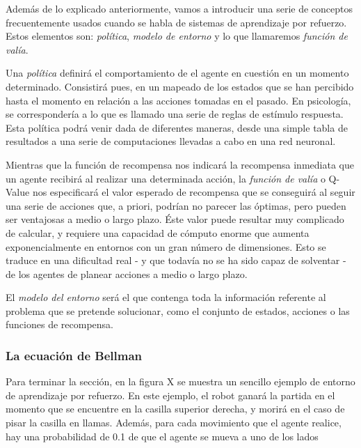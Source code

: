 \documentclass[11pt,spanish,listoffigures,listoftables]{tfgetsinf}
\begin{document}
Además de lo explicado anteriormente, vamos a introducir una serie de conceptos frecuentemente usados cuando se habla de sistemas de aprendizaje por refuerzo. Estos elementos son: \textit{política}, \textit{modelo de entorno} y lo que llamaremos \textit{función de valía}.

Una \textit{política} definirá el comportamiento de el agente en cuestión en un momento determinado. Consistirá pues, en un mapeado de los estados que se han percibido hasta el momento en relación a las acciones tomadas en el pasado. En psicología, se correspondería a lo que es llamado una serie de reglas de estímulo respuesta. Esta política podrá venir dada de diferentes maneras, desde una simple tabla de resultados a una serie de computaciones llevadas a cabo en una red neuronal.

Mientras que la función de recompensa nos indicará la recompensa inmediata que un agente recibirá al realizar una determinada acción, la \textit{función de valía} o Q-Value nos especificará el valor esperado de recompensa que se conseguirá al seguir una serie de acciones que, a priori, podrían no parecer las óptimas, pero pueden ser ventajosas a medio o largo plazo. Éste valor puede resultar muy complicado de calcular, y requiere una capacidad de cómputo enorme que aumenta exponencialmente en entornos con un gran número de dimensiones. Esto se traduce en una dificultad real - y que todavía no se ha sido capaz de solventar - de los agentes de planear acciones a medio o largo plazo. 

El \textit{modelo del entorno} será el que contenga toda la información referente al problema que se pretende solucionar, como el conjunto de estados, acciones o las funciones de recompensa.




\subsubsection{La ecuación de Bellman}



Para terminar la sección, en la figura X se muestra un sencillo ejemplo de entorno de aprendizaje por refuerzo. En este ejemplo, el robot ganará la partida en el momento que se encuentre en la casilla superior derecha, y morirá en el caso de pisar la casilla en llamas. Además, para cada movimiento que el agente realice, hay una probabilidad de 0.1 de que el agente se mueva a uno de los lados
\end{document}
